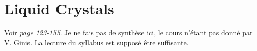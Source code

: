\chapter{Liquid Crystals}
Voir \textit{page 123-155}. Je ne fais pas de synthèse ici, le cours n'étant pas donné par V. Ginis. La lecture du
syllabus est supposé être suffisante. 